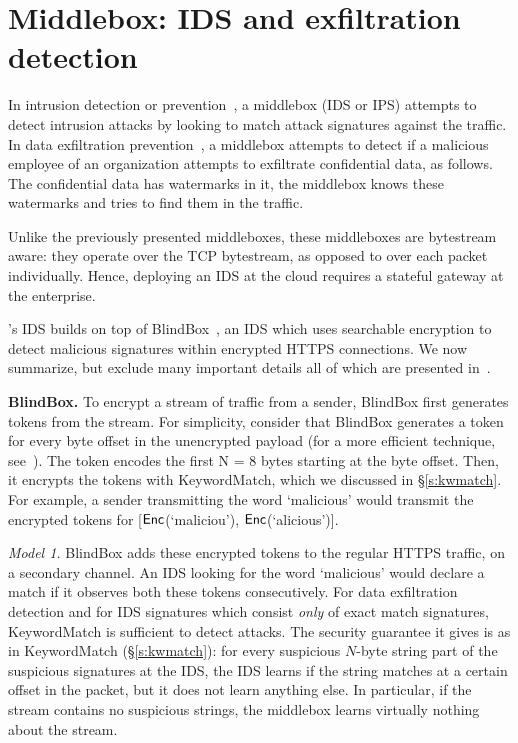 


\section{Middlebox: IDS and exfiltration detection}\label{sec:ids}

In intrusion detection or prevention~\cite{Snort}, a middlebox (IDS or IPS) attempts to detect intrusion attacks by looking to match attack signatures against the traffic.
In data exfiltration prevention~\cite{CMU_exfiltration_report}, a middlebox attempts to detect if a malicious employee of an organization 
attempts to exfiltrate confidential data, as follows.  The confidential data has watermarks in it, the middlebox knows these watermarks and tries to find them
in the traffic. 

Unlike the previously presented middleboxes, these middleboxes are bytestream aware:  they operate over the TCP bytestream, as opposed to over each packet individually. Hence, deploying an IDS at the cloud requires a stateful gateway at the enterprise.

\sys's IDS builds on top of BlindBox~\cite{blindbox}, an IDS which uses searchable encryption to detect malicious signatures within encrypted HTTPS connections. We now  summarize, but exclude many important details all of which are presented in~\cite{blindbox}.

\noindent\textbf{BlindBox.}
To encrypt a stream of traffic from a sender, BlindBox first generates tokens from the stream.  
For simplicity, consider that BlindBox generates a token for  every byte offset in the unencrypted payload (for a more efficient technique, see~\cite{blindbox}). 
The  token encodes the first N = 8 bytes starting at the byte offset. Then, it encrypts the tokens with KeywordMatch, which we discussed in \S\ref{s:kwmatch}.
For example, a sender transmitting the word `malicious' would transmit the encrypted tokens for [$\mathsf{Enc}$(`maliciou'), $\mathsf{Enc}$(`alicious')].

 {\em Model 1.} BlindBox adds these encrypted tokens to the  regular HTTPS traffic, on  a secondary channel.
An IDS looking for the word `malicious' would declare a match if it observes both these tokens consecutively.
For data exfiltration detection and for IDS signatures which consist {\it only} of exact match signatures, KeywordMatch is sufficient to detect attacks.
The security guarantee it gives is as in KeywordMatch (\S\ref{s:kwmatch}): for every suspicious $N$-byte string part of the suspicious signatures at the IDS, the IDS learns if the string matches at a certain offset in the packet, but it does not learn anything else. In particular, if the stream contains no suspicious strings, the middlebox learns virtually nothing about the stream. 

